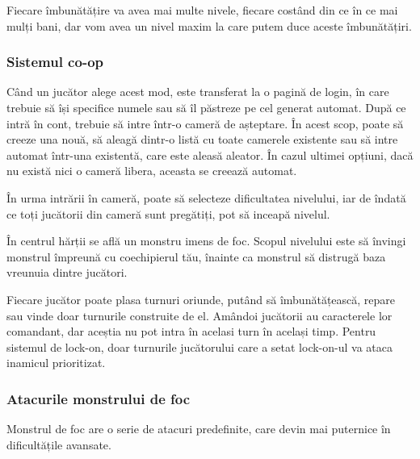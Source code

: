 \documentclass[12pt, a4paper]{article}
\begin{document}
	Fiecare îmbunătățire va avea mai multe nivele, fiecare costând din ce în ce mai mulți bani, dar vom avea un nivel maxim la care putem duce aceste îmbunătățiri.
	
	
	
	
	
	\subsubsection{Sistemul co-op}
	
	Când un jucător alege acest mod, este transferat la o pagină de login, în care trebuie să își specifice numele sau să îl păstreze pe cel generat automat. După ce intră în cont, trebuie să intre într-o cameră de așteptare. În acest scop, poate să creeze una nouă, să aleagă dintr-o listă cu toate camerele existente sau să intre automat într-una existentă, care este aleasă aleator. În cazul ultimei opțiuni, dacă nu există nici o cameră libera, aceasta se creează automat. 
	\newline
	
	În urma intrării în cameră, poate să selecteze dificultatea nivelului, iar de îndată ce toți jucătorii din cameră sunt pregătiți, pot să inceapă nivelul.
	\newline
	
	În centrul hărții se află un monstru imens de foc. Scopul nivelului este să învingi monstrul împreună cu coechipierul tău, înainte ca monstrul să distrugă baza vreunuia dintre jucători.
	\newline
	
	Fiecare jucător poate plasa turnuri oriunde, putând să îmbunătățească, repare sau vinde doar turnurile construite de el. Amândoi jucătorii au caracterele lor comandant, dar aceștia nu pot intra în acelasi turn în același timp. Pentru sistemul de lock-on, doar turnurile jucătorului care a setat lock-on-ul va ataca inamicul prioritizat.
	
	
	
	
	
	\subsubsection{Atacurile monstrului de foc}
	
	Monstrul de foc are o serie de atacuri predefinite, care devin mai puternice în dificultățile avansate.
	
\end{document}
